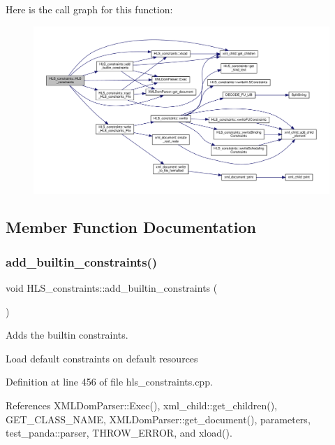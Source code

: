 Here is the call graph for this function\+:
\nopagebreak
\begin{figure}[H]
\begin{center}
\leavevmode
\includegraphics[width=350pt]{dd/d96/classHLS__constraints_a53af44c5158085582b41f0ad2c6763bf_cgraph}
\end{center}
\end{figure}


\subsection{Member Function Documentation}
\mbox{\label{classHLS__constraints_a26ccdc010e4ed339801844cb83392caa}} 
\subsubsection{\texorpdfstring{add\+\_\+builtin\+\_\+constraints()}{add\_builtin\_constraints()}}
{\footnotesize\ttfamily void H\+L\+S\+\_\+constraints\+::add\+\_\+builtin\+\_\+constraints (\begin{DoxyParamCaption}{ }\end{DoxyParamCaption})}



Adds the builtin constraints. 

Load default constraints on default resources 

Definition at line 456 of file hls\+\_\+constraints.\+cpp.



References X\+M\+L\+Dom\+Parser\+::\+Exec(), xml\+\_\+child\+::get\+\_\+children(), G\+E\+T\+\_\+\+C\+L\+A\+S\+S\+\_\+\+N\+A\+ME, X\+M\+L\+Dom\+Parser\+::get\+\_\+document(), parameters, test\+\_\+panda\+::parser, T\+H\+R\+O\+W\+\_\+\+E\+R\+R\+OR, and xload().



